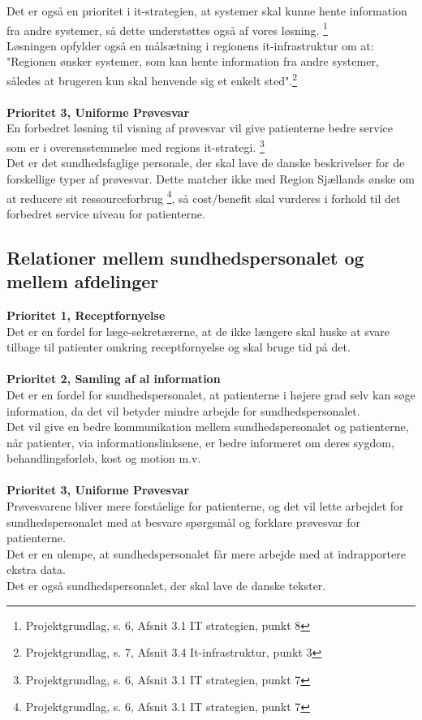 Det er også en prioritet i it-strategien, at systemer skal kunne hente information fra andre systemer, så dette understøttes også af vores løsning. \footnote{Projektgrundlag, s. 6, Afsnit 3.1 IT strategien, punkt 8} \\
Løsningen opfylder også en målsætning i regionens it-infrastruktur om at: "Regionen ønsker systemer, som kan hente information fra andre systemer, således at brugeren kun skal henvende sig et enkelt sted".\footnote{Projektgrundlag, s. 7, Afsnit 3.4 It-infrastruktur, punkt 3}
\\\\
\textbf{Prioritet 3, Uniforme Prøvesvar}\\ %
En forbedret løsning til visning af prøvesvar vil give patienterne bedre service som er i overensstemmelse med regions it-strategi. \footnote{Projektgrundlag, s. 6, Afsnit 3.1 IT strategien, punkt 7}\\
Det er det sundhedsfaglige personale, der skal lave de danske beskrivelser for de forskellige typer af prøvesvar. Dette matcher ikke med Region Sjællands ønske om at reducere sit ressourceforbrug \footnote{Projektgrundlag, s. 6, Afsnit 3.1 IT strategien, punkt 7}, så cost/benefit skal vurderes i forhold til det forbedret service niveau for patienterne. 
\subsection{Relationer mellem sundhedspersonalet og mellem afdelinger}
\textbf{Prioritet 1, Receptfornyelse}\\
Det er en fordel for læge-sekretærerne, at de ikke længere skal huske at svare tilbage til patienter omkring receptfornyelse og skal bruge tid på det.
\\\\
\textbf{Prioritet 2, Samling af al information}\\
Det er en fordel for sundhedspersonalet, at patienterne i højere grad selv kan søge information, da det vil betyder mindre arbejde for sundhedspersonalet.\\
Det vil give en bedre kommunikation mellem sundhedspersonalet og patienterne, når patienter, via informationslinksene, er bedre informeret om deres sygdom, behandlingsforløb, kost og motion m.v.
\\\\
\textbf{Prioritet 3, Uniforme Prøvesvar}\\
Prøvesvarene bliver mere forståelige for patienterne, og det vil lette arbejdet for sundhedspersonalet med at besvare spørgsmål og forklare prøvesvar for patienterne.\\
Det er en ulempe, at sundhedspersonalet får mere arbejde med at indrapportere ekstra data. \\ Det er også sundhedspersonalet, der skal lave de danske tekster.
